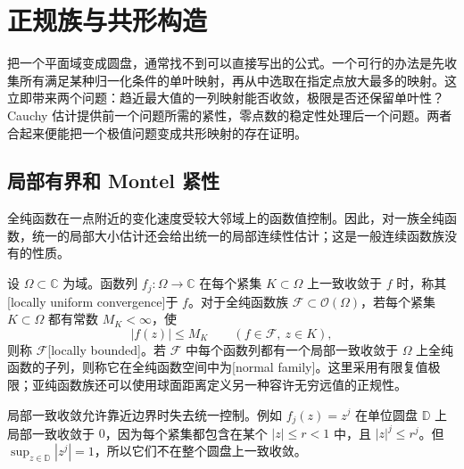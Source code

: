 
% 
% 
% 

\section{正规族与共形构造}
\label{g4:sec:0104}

把一个平面域变成圆盘，通常找不到可以直接写出的公式。一个可行的办法是先收集所有满足某种归一化条件的单叶映射，再从中选取在指定点放大最多的映射。这立即带来两个问题：趋近最大值的一列映射能否收敛，极限是否还保留单叶性？Cauchy 估计提供前一个问题所需的紧性，零点数的稳定性处理后一个问题。两者合起来便能把一个极值问题变成共形映射的存在证明。

\subsection{局部有界和 Montel 紧性}
\label{g4:subsec:0104:01}

全纯函数在一点附近的变化速度受较大邻域上的函数值控制。因此，对一族全纯函数，统一的局部大小估计还会给出统一的局部连续性估计；这是一般连续函数族没有的性质。

\begin{definition}\label{g4:def:0104:normal-family}
	设 \(\Omega\subset\mathbb C\) 为域。函数列 \(f_j:\Omega\to\mathbb C\) 在每个紧集 \(K\subset\Omega\) 上一致收敛于 \(f\) 时，称其[locally uniform convergence]于 \(f\)。对于全纯函数族 \(\mathcal F\subset\mathcal O(\Omega)\)，若每个紧集 \(K\subset\Omega\) 都有常数 \(M_K<\infty\)，使
	\[
		|f(z)|\le M_K\qquad(f\in\mathcal F,\ z\in K),
	\]
	则称 \(\mathcal F\)[locally bounded]。若 \(\mathcal F\) 中每个函数列都有一个局部一致收敛于 \(\Omega\) 上全纯函数的子列，则称它在全纯函数空间中为[normal family]。这里采用有限复值极限；亚纯函数族还可以使用球面距离定义另一种容许无穷远值的正规性。
\end{definition}

局部一致收敛允许靠近边界时失去统一控制。例如 \(f_j(z)=z^j\) 在单位圆盘 \(\mathbb D\) 上局部一致收敛于 \(0\)，因为每个紧集都包含在某个 \(|z|\le r<1\) 中，且 \(|z|^j\le r^j\)。但 \(\sup_{z\in\mathbb D}|z^j|=1\)，所以它们不在整个圆盘上一致收敛。

